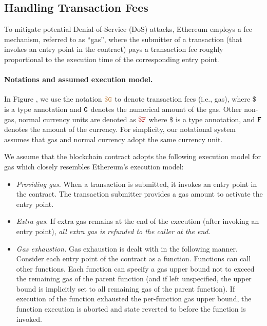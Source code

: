 


\subsection{Handling Transaction Fees}

To mitigate potential Denial-of-Service (DoS) attacks, 
Ethereum employs a fee mechanism, referred to as ``gas'', 
where the submitter of a transaction (that invokes
an entry point in the contract) pays a  
transaction fee
roughly proportional to the execution time of the 
corresponding entry point.

\paragraph{Notations and assumed execution model.}
In Figure , we
use the notation $\tt {\color{brown} \$ G }$
to denote transaction fees (i.e., gas), 
where $\$$ is a type annotation 
and ${\tt G}$ denotes the numerical amount of the  
gas. Other non-gas, normal currency units 
are denoted as $\smaroon{\$ F}$ where $\$$ is a type annotation,
and ${\tt F}$ denotes the amount of the currency. 
For simplicity, our notational system assumes 
that gas and normal currency adopt
the same currency unit. 

We assume that the blockchain contract adopts the following execution model
for gas which closely resembles Ethereum's execution model:
\begin{itemize}[leftmargin=5mm]
\item
{\it Providing gas.} 
When a transaction is submitted, it invokes an entry point in the contract.
The transaction submitter provides a gas amount to activate the entry point. 
\item
{\it Extra gas.} 
If extra gas remains at the end of the execution (after invoking an entry point),
{\it all extra gas is refunded to the caller at the end}.
\item
{\it Gas exhaustion.} 
Gas exhaustion is dealt with in the following manner.
Consider each entry point of the contract as a function. 
Functions can call other functions.
Each function can specify a gas upper bound not to exceed
the remaining gas of the parent function (and if left unspecified,
the upper bound is implicitly set to all remaining gas of the parent function).
If execution of the function exhausted the per-function gas 
upper bound, the function execution is aborted and 
state reverted to before the function is invoked.
\end{itemize}

